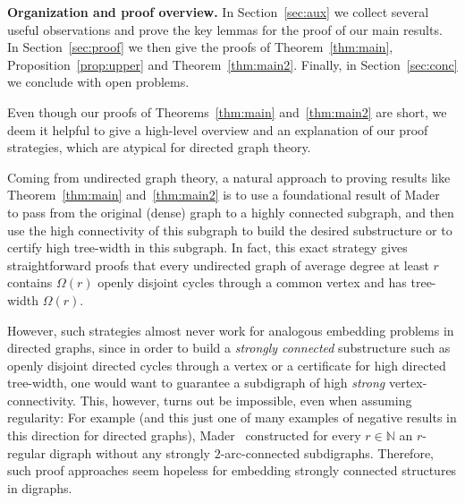 \documentclass[a4paper,10pt]{article}
\begin{document}
\textbf{Organization and proof overview.} In Section~\ref{sec:aux} we collect several useful observations and prove the key lemmas for the proof of our main results. In Section~\ref{sec:proof} we then give the proofs of Theorem~\ref{thm:main}, Proposition~\ref{prop:upper} and Theorem~\ref{thm:main2}. Finally, in Section~\ref{sec:conc} we conclude with open problems.

Even though our proofs of Theorems~\ref{thm:main} and~\ref{thm:main2} are short, we deem it helpful to give a high-level overview and an explanation of our proof strategies, which are atypical for directed graph theory.

Coming from undirected graph theory, a natural approach to proving results like Theorem~\ref{thm:main} and~\ref{thm:main2} is to use a foundational result of Mader~\cite{MR306050} to pass from the original (dense) graph to a highly connected subgraph, and then use the high connectivity of this subgraph to build the desired substructure or to certify high tree-width in this subgraph. In fact, this exact strategy gives straightforward proofs that every undirected graph of average degree at least $r$ contains $\Omega(r)$ openly disjoint cycles through a common vertex and has tree-width $\Omega(r)$.

However, such strategies almost never work for analogous embedding problems in directed graphs, since in order to build a \emph{strongly connected} substructure such as openly disjoint directed cycles through a vertex or a certificate for high directed tree-width, one would want to guarantee a subdigraph of high \emph{strong} vertex-connectivity. This, however, turns out be impossible, even when assuming regularity: For example (and this just one of many examples of negative results in this direction for directed graphs), Mader~\cite{MR2588727} constructed for every $r\in \mathbb{N}$ an $r$-regular digraph without any strongly $2$-arc-connected subdigraphs. Therefore,  such proof approaches seem hopeless for embedding strongly connected structures in digraphs.
\end{document}

